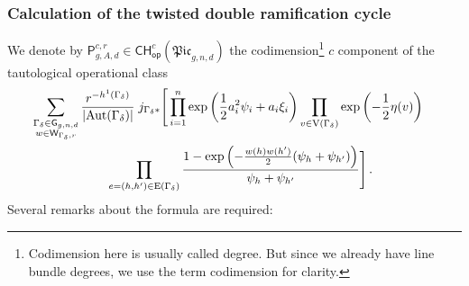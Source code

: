 \documentclass[a4paper,12pt]{article} %
\def\P{\mathsf{P}}
\def\Aut{{\rm Aut}}
\def\E{\mathrm{E}}
\def\V{\mathrm{V}}
\def\G{\mathsf{G}}
\theoremstyle{definition}
\theoremstyle{plain}%
\newcommand{\Picabs}{\mathfrak{Pic}}
\begin{document}
\subsubsection{Calculation of the twisted double ramification cycle} \label{Ssec:MainFormula}
We denote by
$\P_{g,A,d}^{c,r}\in \mathsf{CH}^c_{\mathsf{op}}(\Picabs_{g,n,d})$
the codimension{\footnote{Codimension here is usually
called degree. But since we already have line bundle degrees,
we use the term codimension for clarity.}}
 $c$ component of the tautological operational class 
\begin{multline*}
\hspace{-10pt}\sum_{
\substack{\Gamma_\delta\in \G_{g,n,d} \\
w\in \mathsf{W}_{\Gamma_\delta,r}}
}
\frac{r^{-h^1(\Gamma_\delta)}}{|\Aut(\Gamma_\delta)| }
\;
j_{\Gamma_\delta*}\Bigg[
\prod_{i=1}^n \exp\left(\frac12 a_i^2 \psi_i + a_i \xi_i \right)
\prod_{v \in \V(\Gamma_\delta)} \exp\left(-\frac12 \eta(v) \right)
\\ \hspace{+10pt}
\prod_{e=(h,h')\in \E(\Gamma_\delta)}
\frac{1-\exp\left(-\frac{w(h)w(h')}2(\psi_h+\psi_{h'})\right)}{\psi_h + \psi_{h'}} \Bigg]\, .
\end{multline*} 
Several remarks about the formula are required:
\end{document}

